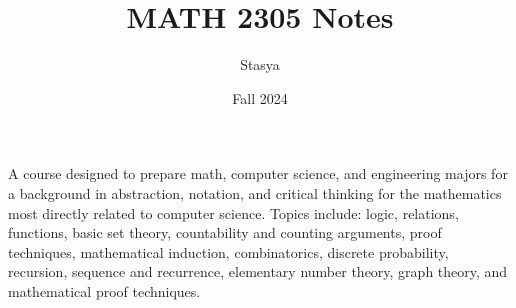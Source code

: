 \documentclass[10pt,a4paper,oneside]{book}
\title{MATH 2305 Notes}
\author{Stasya}
\date{Fall 2024}
\begin{document}
\maketitle
\bigbreak
\begin{center}
    A course designed to prepare math, computer science, and engineering majors for a background in abstraction, notation, 
    and critical thinking for the mathematics most directly related to computer science. Topics include: logic, 
    relations, functions, basic set theory, countability and counting arguments, proof techniques, mathematical induction, 
    combinatorics, discrete probability, recursion, sequence and recurrence, elementary number theory, graph theory, and 
    mathematical proof techniques.
\end{center}
\bigbreak
\tableofcontents











\end{document}
